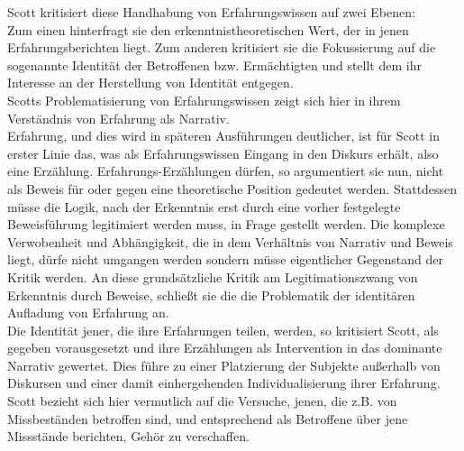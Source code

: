 \noindent Scott kritisiert diese Handhabung von Erfahrungswissen auf zwei Ebenen:\\
 Zum
einen hinterfragt sie den erkenntnistheoretischen Wert, der in jenen
Erfahrungsberichten liegt. Zum anderen kritisiert sie die Fokussierung auf die
sogenannte Identität der Betroffenen bzw. Ermächtigten und stellt dem ihr
Interesse an der Herstellung von Identität entgegen.\\
Scotts Problematisierung
von Erfahrungswissen zeigt sich hier in ihrem Verständnis von Erfahrung als
Narrativ.\\
 Erfahrung, und dies wird in späteren Ausführungen deutlicher, ist für
Scott in erster Linie das, was als Erfahrungswissen Eingang in den Diskurs
erhält, also eine Erzählung. Erfahrungs-Erzählungen dürfen, so argumentiert sie
nun, nicht als Beweis für oder gegen eine theoretische Position gedeutet
werden. Stattdessen müsse die Logik, nach der Erkenntnis erst durch eine vorher
festgelegte Beweisführung legitimiert werden muss, in Frage gestellt werden.
Die komplexe Verwobenheit und Abhängigkeit, die in dem Verhältnis von Narrativ
und Beweis liegt, dürfe nicht umgangen werden sondern müsse eigentlicher
Gegenstand der Kritik werden. An diese grundsätzliche Kritik am
Legitimationszwang von Erkenntnis durch Beweise, schließt sie die die
Problematik der identitären Aufladung von Erfahrung an.\\
Die Identität jener, die ihre Erfahrungen teilen, werden, so kritisiert Scott,
als gegeben vorausgesetzt und ihre Erzählungen als Intervention in das
dominante Narrativ gewertet. Dies führe zu einer Platzierung der Subjekte
außerhalb von Diskursen und einer damit einhergehenden Individualisierung ihrer
Erfahrung. Scott bezieht sich hier vermutlich auf die Versuche, jenen, die z.B.
von Missbeständen betroffen sind, und entsprechend als Betroffene über jene
Missstände berichten, Gehör zu verschaffen. \\

